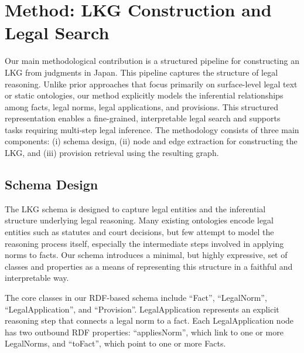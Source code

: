 \documentclass[11pt]{article}
\begin{document}
\section{Method: LKG Construction and Legal Search}
\label{sec:lkg-construction}

Our main methodological contribution is a structured pipeline for constructing an LKG from judgments in Japan. This pipeline captures the structure of legal reasoning. Unlike prior approaches that focus primarily on surface-level legal text or static ontologies, our method explicitly models the inferential relationships among facts, legal norms, legal applications, and provisions. This structured representation enables a fine-grained, interpretable legal search and supports tasks requiring multi-step legal inference. The methodology consists of three main components: (i) schema design, (ii) node and edge extraction for constructing the LKG, and (iii) provision retrieval using the resulting graph.

\subsection{Schema Design}



The LKG schema is designed to capture legal entities and the inferential structure underlying legal reasoning. Many existing ontologies encode legal entities such as statutes and court decisions, but few attempt to model the reasoning process itself, especially the intermediate steps involved in applying norms to facts. Our schema introduces a minimal, but highly expressive, set of classes and properties as a means of representing this structure in a faithful and interpretable way.



The core classes in our RDF-based schema include ``Fact'', ``LegalNorm'', ``LegalApplication'', and ``Provision''. LegalApplication represents an explicit reasoning step that connects a legal norm to a fact. Each LegalApplication node has two outbound RDF properties: ``appliesNorm'', which link to one or more LegalNorms, and ``toFact'', which point to one or more Facts.
\end{document}

